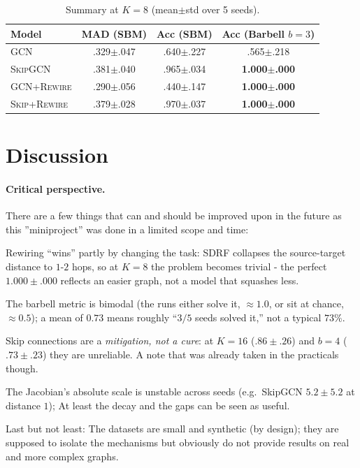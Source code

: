 \documentclass[inlineanswers]{exam2024}
\begin{document}
\begin{table}[t]
\centering
\small
\caption{Summary at $K{=}8$ (mean$\pm$std over 5 seeds). }
\label{tab:summary}
\begin{tabular}{lccc}
\toprule
Model & MAD (SBM) & Acc (SBM) & Acc (Barbell $b{=}3$)\\
\midrule
\textsc{GCN}          & .329$\pm$.047 & .640$\pm$.227 & .565$\pm$.218 \\
\textsc{SkipGCN}      & .381$\pm$.040 & .965$\pm$.034 & \textbf{1.000$\pm$.000} \\
\textsc{GCN+Rewire}   & .290$\pm$.056 & .440$\pm$.147 & \textbf{1.000$\pm$.000} \\
\textsc{Skip+Rewire}  & .379$\pm$.028 & .970$\pm$.037 & \textbf{1.000$\pm$.000} \\
\bottomrule
\end{tabular}
\end{table}

\section{Discussion}
\label{sec:discussion}

\paragraph{Critical perspective.}
There are a few things that can and should be improved upon in the future as this ''miniproject'' was done in a limited scope and time:

\begin{part}
    Rewiring ``wins'' partly by changing the task: SDRF collapses the source-target distance to $1$-$2$ hops, so at $K{=}8$ the problem becomes trivial - the perfect $1.000\pm.000$ reflects an easier graph, not a model that squashes less. 
    \item The barbell metric is bimodal (the runs either solve it, $\approx1.0$, or sit at chance, $\approx0.5$); a mean of $0.73$ means roughly ``$3/5$ seeds solved it,'' not a typical $73\%$. 
    \item Skip connections are a \emph{mitigation, not a cure}: at $K{=}16$ ($.86\pm.26$) and $b{=}4$ ($.73\pm.23$) they are unreliable. A note that was already taken in the practicals though.
    \item The Jacobian's absolute scale is unstable across seeds (e.g.\ SkipGCN $5.2\pm5.2$ at distance $1$); At least the decay and the gaps can be seen as useful.
    \item Last but not least: The datasets are small and synthetic (by design); they are supposed to isolate the mechanisms but obviously do not provide results on real and more complex graphs.
\end{part}
\end{document}
